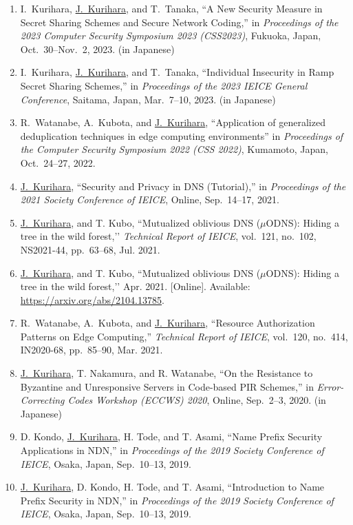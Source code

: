 \begin{enumerate}
 \item I.~Kurihara, \underline{J.~Kurihara}, and T.~Tanaka,
       ``A New Security Measure in Secret Sharing Schemes and Secure Network Coding,''
       in \textit{Proceedings of the 2023 Computer Security Symposium 2023 (CSS2023)},
       Fukuoka, Japan, Oct.~30--Nov.~2, 2023. (in Japanese)
 \item I.~Kurihara, \underline{J.~Kurihara}, and T.~Tanaka,
       ``Individual Insecurity in Ramp Secret Sharing Schemes,''
       in \textit{Proceedings of the 2023 IEICE General Conference},
       Saitama, Japan, Mar.~7--10, 2023. (in Japanese)
 \item R.~Watanabe, A.~Kubota, and \underline{J.~Kurihara}, ``Application of generalized deduplication techniques in edge computing environments'' in \textit{Proceedings of the Computer Security Symposium 2022 (CSS 2022)}, Kumamoto, Japan, Oct.~24--27, 2022.
 \item \underline{J.~Kurihara}, ``Security and Privacy in DNS (Tutorial),'' in \textit{Proceedings of the 2021 Society Conference of IEICE}, Online, Sep.~14--17, 2021.
 \item \underline{J.~Kurihara}, and T. Kubo, ``Mutualized oblivious DNS ($\mu$ODNS): Hiding a tree in the wild forest,’’ \textit{Technical Report of IEICE}, vol.~121, no.~102, NS2021-44, pp.~63--68, Jul. 2021.
 \item \underline{J.~Kurihara}, and T. Kubo, ``Mutualized oblivious DNS ($\mu$ODNS): Hiding a tree in the wild forest,’’ Apr. 2021. [Online]. Available: \url{https://arxiv.org/abs/2104.13785}.
\item R.~Watanabe, A.~Kubota, and \underline{J.~Kurihara}, ``Resource Authorization Patterns on Edge Computing,'' \textit{Technical Report of IEICE}, vol.~120, no.~414, IN2020-68, pp.~85--90, Mar. 2021.
 \item \underline{J.~Kurihara}, T. Nakamura, and R. Watanabe, ``On the Resistance to Byzantine and Unresponsive Servers in Code-based PIR Schemes,'' in \textit{Error-Correcting Codes Workshop (ECCWS) 2020}, Online, Sep.~2--3, 2020. (in Japanese)
 \item D. Kondo, \underline{J.~Kurihara}, H. Tode, and T. Asami, ``Name Prefix Security Applications in NDN,'' in \textit{Proceedings of the 2019 Society Conference of IEICE}, Osaka, Japan, Sep.~10--13, 2019.
 \item \underline{J.~Kurihara}, D. Kondo, H. Tode, and T. Asami, ``Introduction to Name Prefix Security in NDN,'' in \textit{Proceedings of the 2019 Society Conference of IEICE}, Osaka, Japan, Sep.~10--13, 2019.

\end{enumerate}
